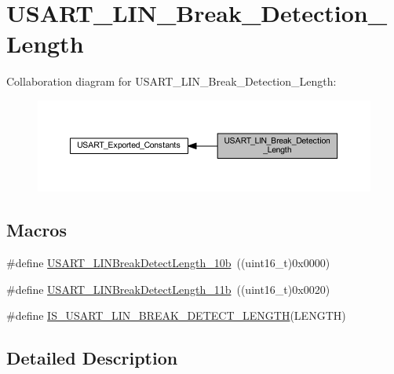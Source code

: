 \hypertarget{group___u_s_a_r_t___l_i_n___break___detection___length}{}\section{U\+S\+A\+R\+T\+\_\+\+L\+I\+N\+\_\+\+Break\+\_\+\+Detection\+\_\+\+Length}
\label{group___u_s_a_r_t___l_i_n___break___detection___length}
Collaboration diagram for U\+S\+A\+R\+T\+\_\+\+L\+I\+N\+\_\+\+Break\+\_\+\+Detection\+\_\+\+Length\+:
\nopagebreak
\begin{figure}[H]
\begin{center}
\leavevmode
\includegraphics[width=350pt]{group___u_s_a_r_t___l_i_n___break___detection___length}
\end{center}
\end{figure}
\subsection*{Macros}
\begin{DoxyCompactItemize}
\item 
\#define \hyperlink{group___u_s_a_r_t___l_i_n___break___detection___length_gacfd0aabae8774239440e828c961ac2a0}{U\+S\+A\+R\+T\+\_\+\+L\+I\+N\+Break\+Detect\+Length\+\_\+10b}~((uint16\+\_\+t)0x0000)
\item 
\#define \hyperlink{group___u_s_a_r_t___l_i_n___break___detection___length_gaf591cfcc859d67d71e6fa594eb5aec16}{U\+S\+A\+R\+T\+\_\+\+L\+I\+N\+Break\+Detect\+Length\+\_\+11b}~((uint16\+\_\+t)0x0020)
\item 
\#define \hyperlink{group___u_s_a_r_t___l_i_n___break___detection___length_gaa7a45d542b1df5da1160777ad4a80d72}{I\+S\+\_\+\+U\+S\+A\+R\+T\+\_\+\+L\+I\+N\+\_\+\+B\+R\+E\+A\+K\+\_\+\+D\+E\+T\+E\+C\+T\+\_\+\+L\+E\+N\+G\+TH}(L\+E\+N\+G\+TH)
\end{DoxyCompactItemize}


\subsection{Detailed Description}



